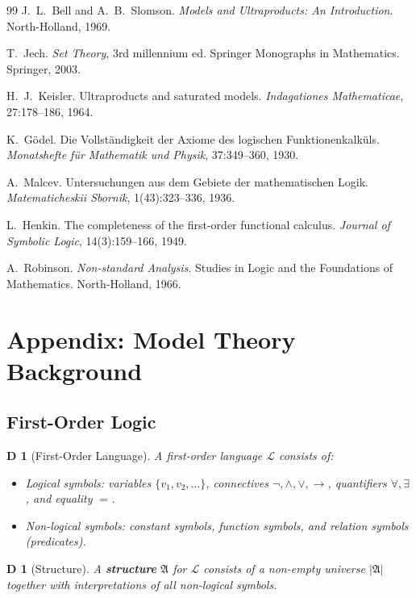 \documentclass[12pt,a4paper]{article}
\newtheorem{definition}[theorem]Definition
\theoremstyle{remark}
\newcommand{\Lang}{\mathcal{L}}
\newcommand{\Struct}{\mathfrak{A}}
\begin{document}
\begin{thebibliography}{99}
J.~L.~Bell and A.~B.~Slomson.
\emph{Models and Ultraproducts: An Introduction}.
North-Holland, 1969.

T.~Jech.
\emph{Set Theory}, 3rd millennium ed.
Springer Monographs in Mathematics.
Springer, 2003.

H.~J.~Keisler.
Ultraproducts and saturated models.
\emph{Indagationes Mathematicae}, 27:178--186, 1964.

K.~Gödel.
Die Vollständigkeit der Axiome des logischen Funktionenkalküls.
\emph{Monatshefte für Mathematik und Physik}, 37:349--360, 1930.

A.~Malcev.
Untersuchungen aus dem Gebiete der mathematischen Logik.
\emph{Matematicheskii Sbornik}, 1(43):323--336, 1936.

L.~Henkin.
The completeness of the first-order functional calculus.
\emph{Journal of Symbolic Logic}, 14(3):159--166, 1949.

A.~Robinson.
\emph{Non-standard Analysis}.
Studies in Logic and the Foundations of Mathematics.
North-Holland, 1966.
\end{thebibliography}
\appendix
\section{Appendix: Model Theory Background}
\subsection{First-Order Logic}
\begin{definition}[First-Order Language]
A first-order language \(\Lang\) consists of:
\begin{itemize}[itemsep=2pt]
    \item Logical symbols: variables \(\{v_1, v_2, \ldots\}\), connectives \(\neg, \land, \lor, \to\), quantifiers \(\forall, \exists\), and equality \(=\).
    \item Non-logical symbols: constant symbols, function symbols, and relation symbols (predicates).
\end{itemize}
\end{definition}

\begin{definition}[Structure]
A \textbf{structure} \(\Struct\) for \(\Lang\) consists of a non-empty universe \(|\Struct|\) together with interpretations of all non-logical symbols.
\end{definition}
\end{document}
